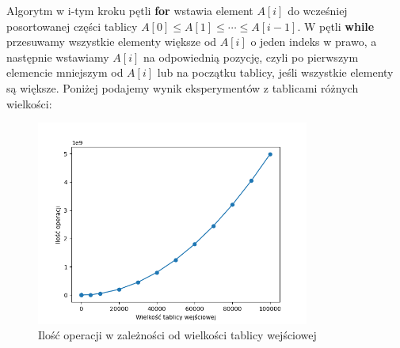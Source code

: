 \documentclass{article}
\begin{document}
Algorytm w i-tym kroku pętli \textbf{for} wstawia element $A[i]$ do wcześniej posortowanej części tablicy $A[0] \leq A[1] \leq \cdots \leq A[i-1]$. W pętli \textbf{while} przesuwamy wszystkie elementy większe od $A[i]$ o jeden indeks w prawo, a następnie wstawiamy $A[i]$ na odpowiednią pozycję, czyli po pierwszym elemencie mniejszym od $A[i]$ lub na początku tablicy, jeśli wszystkie elementy są większe.
Poniżej podajemy wynik eksperymentów z tablicami różnych wielkości:
\begin{figure}[H]
    \centering
    \includegraphics[width=0.8\textwidth]{Figure_1.png}
    \caption{Ilość operacji w zależności od wielkości tablicy wejściowej}
    \label{fig:moj_obraz}
\end{figure}
\end{document}
